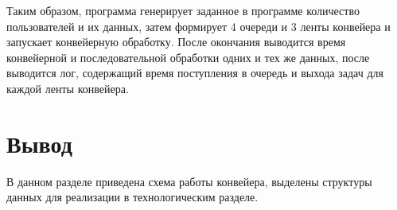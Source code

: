 \documentclass[../report.tex]{subfiles}
\begin{document}
Таким образом, программа генерирует заданное в программе количество пользователей и их данных, затем формирует 4 очереди и 3 ленты конвейера и запускает конвейерную обработку. После окончания выводится время конвейерной и последовательной обработки одних и тех же данных, после выводится лог, содержащий время поступления в очередь и выхода задач для каждой ленты конвейера.

\section*{Вывод}
В данном разделе приведена схема работы конвейера, выделены структуры данных для реализации в технологическим разделе. 
\end{document}
